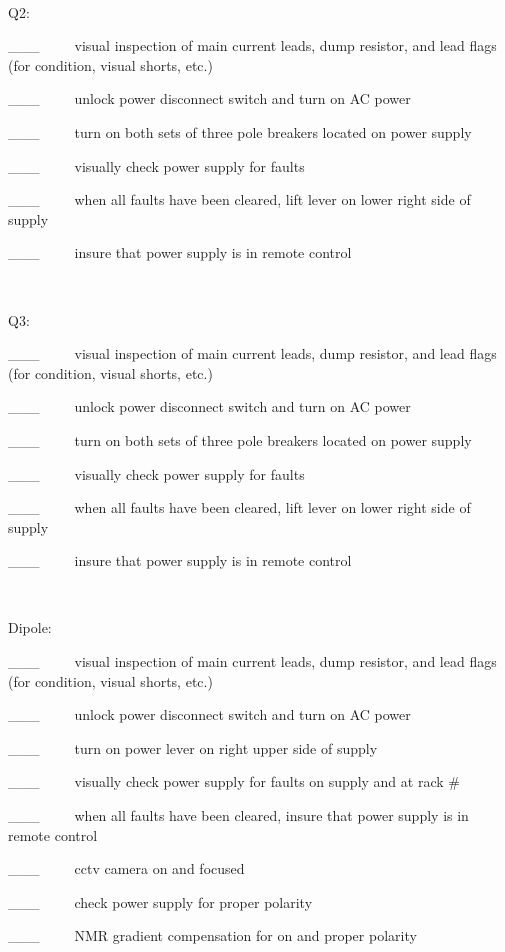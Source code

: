 ~

Q2:~~~~~

\_\_\_~~~~~visual inspection of main current leads, dump resistor, and lead
flags (for condition, visual shorts, etc.)

\_\_\_~~~~~unlock power disconnect switch and turn on AC power

\_\_\_~~~~~turn on both sets of three pole breakers located on power supply

\_\_\_~~~~~visually check power supply for faults

\_\_\_~~~~~when all faults have been cleared, lift lever on lower right side
of supply

\_\_\_~~~~~insure that power supply is in remote control

~

Q3:

\_\_\_~~~~~visual inspection of main current leads, dump resistor, and lead
flags (for condition, visual shorts, etc.)

\_\_\_~~~~~unlock power disconnect switch and turn on AC power

\_\_\_~~~~~turn on both sets of three pole breakers located on power supply

\_\_\_~~~~~visually check power supply for faults

\_\_\_~~~~~when all faults have been cleared, lift lever on lower right side
of supply

\_\_\_~~~~~insure that power supply is in remote control

~

Dipole:

\_\_\_~~~~~visual inspection of main current leads, dump resistor, and lead
flags (for condition, visual shorts, etc.)

\_\_\_~~~~~unlock power disconnect switch and turn on AC power

\_\_\_~~~~~turn on power lever on right upper side of supply

\_\_\_~~~~~visually check power supply for faults on supply and at rack \#

\_\_\_~~~~~when all faults have been cleared, insure that power supply is in
remote control

\_\_\_~~~~~cctv camera on and focused

\_\_\_~~~~~check power supply for proper polarity 

\_\_\_~~~~~NMR gradient compensation for on and proper polarity

~

